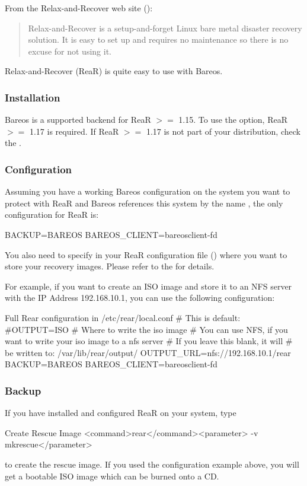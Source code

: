 From the Relax-and-Recover web site
():
\begin{quote}
 Relax-and-Recover is a setup-and-forget Linux bare metal disaster recovery
solution.
It is easy to set up and requires no maintenance so there is no excuse for not
using it.
\end{quote}
Relax-and-Recover (ReaR) is quite easy to use with Bareos.

\subsubsection{Installation}
Bareos is a supported backend for ReaR $>=$ 1.15.
To use the  option, ReaR $>=$ 1.17 is required.
If ReaR $>=$ 1.17 is not part of your distribution, 
check the .

\subsubsection{Configuration}
Assuming you have a working Bareos configuration on the system you want to
protect with ReaR and Bareos references this system by the name , 
the only configuration for ReaR is:

\begin{config}{}
BACKUP=BAREOS
BAREOS_CLIENT=bareosclient-fd
\end{config}

You also need to specify in your ReaR configuration file
()
where
you want to store your recovery images. 
Please refer to the  for details.

For example, if you want to create an ISO
image and store it to an NFS server
with the IP Address 192.168.10.1, you can use the following configuration:

\begin{config}{Full Rear configuration in /etc/rear/local.conf}
# This is default:
#OUTPUT=ISO
# Where to write the iso image
# You can use NFS, if you want to write your iso image to a nfs server
# If you leave this blank, it will
# be written to: /var/lib/rear/output/
OUTPUT_URL=nfs://192.168.10.1/rear
BACKUP=BAREOS
BAREOS_CLIENT=bareosclient-fd
\end{config}

\subsubsection{Backup}
If you have installed and configured ReaR on your system, type
\begin{commands}{Create Rescue Image}
<command>rear</command><parameter> -v mkrescue</parameter>
\end{commands}
to create the rescue image. If you used the configuration example above, you
will get a bootable ISO image which can be burned onto a CD.

